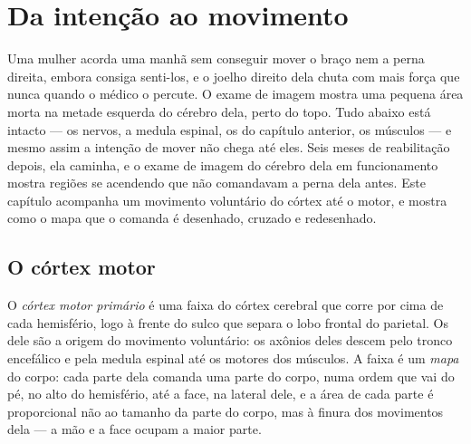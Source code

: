 \chapter{Da intenção ao movimento}\label{ch:g12:brain-and-movement}

Uma mulher acorda uma manhã sem conseguir mover o braço nem a perna
direita, embora consiga senti-los, e o joelho direito dela chuta com
mais força que nunca quando o médico o percute. O exame de imagem
mostra uma pequena área morta na metade esquerda do cérebro dela, perto
do topo. Tudo abaixo está intacto --- os nervos, a medula espinal, os
 do capítulo anterior, os músculos --- e mesmo assim a
intenção de mover não chega até eles. Seis meses de reabilitação
depois, ela caminha, e o exame de imagem do cérebro dela em
funcionamento mostra regiões se acendendo que não comandavam a perna
dela antes. Este capítulo acompanha um movimento voluntário do córtex
até o  motor, e mostra como o mapa que o comanda é desenhado,
cruzado e redesenhado.

\section{O córtex motor}

\begin{definition}\label{def:g12:brain-and-movement:cortex}
O \emph{córtex motor primário} é uma faixa do
córtex cerebral que corre por cima de cada hemisfério, logo à frente do
sulco que separa o lobo frontal do parietal. Os  dele são a
origem do movimento voluntário: os axônios deles descem pelo tronco
encefálico e pela medula espinal até os  motores dos músculos.
A faixa é um \emph{mapa} do corpo: cada parte dela comanda uma parte do
corpo, numa ordem que vai do pé, no alto do hemisfério, até a face, na
lateral dele, e a área de cada parte é proporcional não ao tamanho da
parte do corpo, mas à finura dos movimentos dela --- a mão e a face
ocupam a maior parte.
\end{definition}

